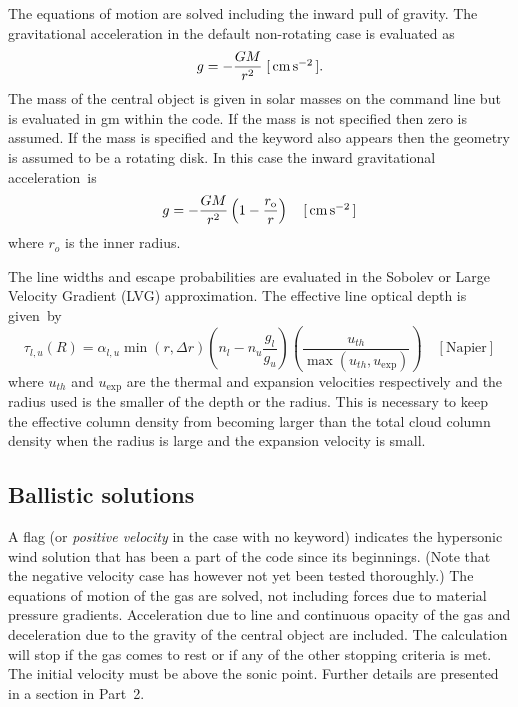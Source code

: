 The equations of motion are solved including the inward pull of gravity.
The gravitational acceleration in the default non-rotating case is
evaluated as
\begin{equation}
g =  - \frac{{GM}}{{r^2 }}\;
 [\mbox{${\rm\thinspace cm}{\rm\thinspace s}^{-2}\,$}].
\end{equation}
The mass of the central object is given in solar masses
on the command line but is evaluated in gm within the code.
If the mass is not specified then zero is assumed.
If the mass is specified and the keyword  also appears
then the geometry is assumed to be a rotating disk.
In this case the inward
gravitational acceleration~is
\begin{equation}
g =  - \frac{{GM}}{{r^2 }}\left( {1 - \frac{{r_{\mathrm{o}} }}{r}} \right)
\quad [\mbox{${\rm\thinspace cm}{\rm\thinspace s}^{-2}\,$}]
\end{equation}
where $r_o$ is the inner radius.

The line widths and escape probabilities are evaluated in the Sobolev
or Large Velocity Gradient (LVG) approximation.
The effective line optical depth is given~by
\begin{equation}
\tau_{l,u}(R)=\alpha_{l,u}\min (r,\Delta
r)\left(n_l-n_u\frac{g_l}{g_u}\right)\left(\frac{u_{th}}{\max
(u_{th},u_{\mathrm{exp}})}\right)\quad
  [\mathrm{Napier}]%
\end{equation}
where $u_{th}$ and $u_{\mathrm{exp}}$ are the thermal and expansion
velocities respectively
and the radius used is the smaller of the depth or the radius.
This is
necessary to keep the effective column density from becoming larger than
the total cloud column density when the radius is large and the expansion
velocity is small.

\subsection{Ballistic solutions}

A  flag (or \emph{positive velocity} in the case
with no  keyword) indicates the hypersonic
wind solution that has been a part of the code since its beginnings.
(Note that the negative velocity case has however not yet been tested
thoroughly.)  The equations of motion of the gas are solved, not
including forces due to material pressure gradients.  Acceleration due
to line and continuous opacity of the gas and deceleration due to the
gravity of the central object are included.  The calculation will stop
if the gas comes to rest or if any of the other stopping criteria is
met.  The initial velocity must be above the sonic point.  Further
details are presented in a section in Part~2.

